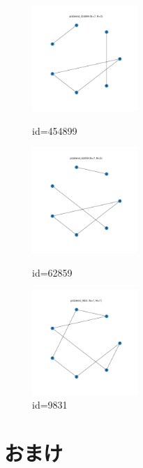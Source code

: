 \documentclass[a4paper, 10pt, dvipdfmx]{jlreq}
\begin{document}
\begin{figure}[htbp]
  \begin{minipage}{0.33\hsize}
    \begin{center}
      \includegraphics[width=40mm]{./img_5/problem4_454899.png}
    \end{center}
    \caption{id=454899}
  \end{minipage}
  \begin{minipage}{0.33\hsize}
    \begin{center}
      \includegraphics[width=40mm]{./img_5/problem4_62859.png}
    \end{center}
    \caption{id=62859}
  \end{minipage}
  \begin{minipage}{0.33\hsize}
    \begin{center}
      \includegraphics[width=40mm]{./img_5/problem4_9831.png}
    \end{center}
    \caption{id=9831}
  \end{minipage}
\end{figure}

\newpage

\section{おまけ}


\end{document}
